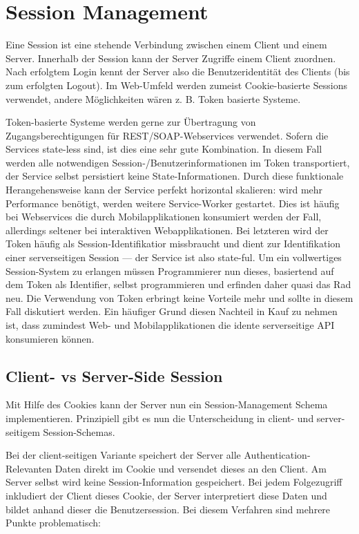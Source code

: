 \chapter{Session Management}

Eine Session ist eine stehende Verbindung zwischen einem Client und einem Server. Innerhalb der Session kann der Server Zugriffe einem Client zuordnen. Nach erfolgtem Login kennt der Server also die Benutzeridentität des Clients (bis zum erfolgten Logout). Im Web-Umfeld werden zumeist Cookie-basierte Sessions verwendet, andere Möglichkeiten wären z. B. Token basierte Systeme.

Token-basierte Systeme werden gerne zur Übertragung von Zugangsberechtigungen für REST/SOAP-Webservices verwendet. Sofern die Services state-less sind, ist dies eine sehr gute Kombination. In diesem Fall werden alle notwendigen Session-/Benutzerinformationen im Token transportiert, der Service selbst persistiert keine State-Informationen. Durch diese funktionale Herangehensweise kann der Service perfekt horizontal skalieren: wird mehr Performance benötigt, werden weitere Service-Worker gestartet. Dies ist häufig bei Webservices die durch Mobilapplikationen konsumiert werden der Fall, allerdings seltener bei interaktiven Webapplikationen. Bei letzteren wird der Token häufig als Session-Identifikatior missbraucht und dient zur Identifikation einer serverseitigen Session --- der Service ist also state-ful. Um ein vollwertiges Session-System zu erlangen müssen Programmierer nun dieses, basiertend auf dem Token als Identifier, selbst programmieren und erfinden daher quasi das Rad neu. Die Verwendung von Token erbringt keine Vorteile mehr und sollte in diesem Fall diskutiert werden. Ein häufiger Grund diesen Nachteil in Kauf zu nehmen ist, dass zumindest Web- und Mobilapplikationen die idente serverseitige API konsumieren können.

\section{Client- vs Server-Side Session}

Mit Hilfe des Cookies kann der Server nun ein Session-Management Schema implementieren. Prinzipiell gibt es nun die Unterscheidung in client- und server-seitigem Session-Schemas.

Bei der client-seitigen Variante speichert der Server alle Authentication-Relevanten Daten direkt im Cookie und versendet dieses an den Client. Am Server selbst wird keine Session-Information gespeichert. Bei jedem Folgezugriff inkludiert der Client dieses Cookie, der Server interpretiert diese Daten und bildet anhand dieser die Benutzersession. Bei diesem Verfahren sind mehrere Punkte problematisch:

